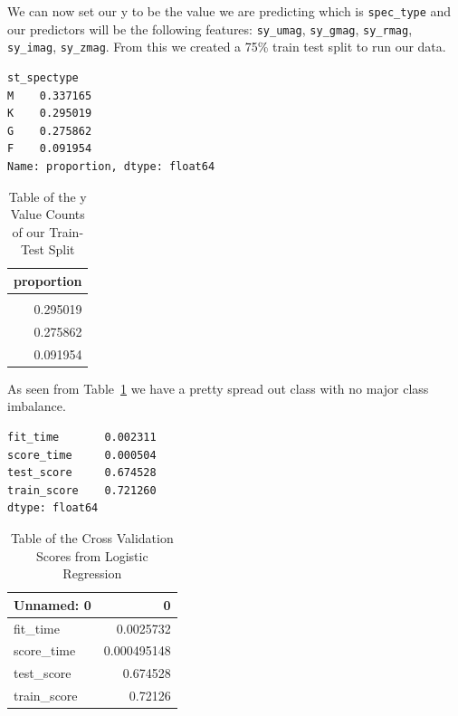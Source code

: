 \documentclass[
  letterpaper,
  DIV=11,
  numbers=noendperiod]{scrartcl}
\begin{document}
We can now set our y to be the value we are predicting which is
\texttt{spec\_type} and our predictors will be the following features:
\texttt{sy\_umag}, \texttt{sy\_gmag}, \texttt{sy\_rmag},
\texttt{sy\_imag}, \texttt{sy\_zmag}. From this we created a 75\% train
test split to run our data.

\begin{verbatim}
st_spectype
M    0.337165
K    0.295019
G    0.275862
F    0.091954
Name: proportion, dtype: float64
\end{verbatim}

\begin{longtable}[]{@{}r@{}}

\caption{\label{tbl-y-train-test-values}Table of the y Value Counts of
our Train-Test Split}

\tabularnewline

\toprule\noalign{}
proportion \\
\midrule\noalign{}
\endhead
\bottomrule\noalign{}
\endlastfoot
0.337165 \\
0.295019 \\
0.275862 \\
0.091954 \\

\end{longtable}

As seen from Table~\ref{tbl-y-train-test-values} we have a pretty spread
out class with no major class imbalance.

\begin{verbatim}
fit_time       0.002311
score_time     0.000504
test_score     0.674528
train_score    0.721260
dtype: float64
\end{verbatim}

\begin{longtable}[]{@{}lr@{}}

\caption{\label{tbl-lr-cross\_validate}Table of the Cross Validation
Scores from Logistic Regression}

\tabularnewline

\toprule\noalign{}
Unnamed: 0 & 0 \\
\midrule\noalign{}
\endhead
\bottomrule\noalign{}
\endlastfoot
fit\_time & 0.0025732 \\
score\_time & 0.000495148 \\
test\_score & 0.674528 \\
train\_score & 0.72126 \\

\end{longtable}
\end{document}
